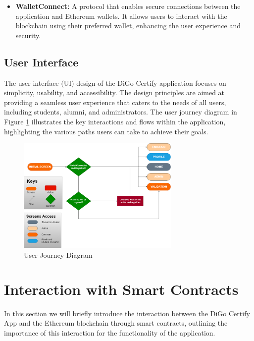 \begin{itemize}
    \item \textbf{WalletConnect:} A protocol that enables secure connections between the application and Ethereum wallets. It allows users to interact with the blockchain using their preferred wallet, enhancing the user experience and security.
\end{itemize}

\subsection{User Interface}

The user interface (UI) design of the DiGo Certify application focuses on simplicity, usability, and accessibility. The design principles are aimed at providing a seamless user experience that caters to the needs of all users, including students, alumni, and administrators.
The user journey diagram in Figure \ref{fig:user-journey} illustrates the key interactions and flows within the application, highlighting the various paths users can take to achieve their goals.

\begin{figure}[H]
    \centering
    \includegraphics[width=0.7\textwidth]{./assets/app-flow.drawio.png}
    \caption{User Journey Diagram}
    \label{fig:user-journey}
\end{figure}

\section{Interaction with Smart Contracts}\label{sec:interaction-with-smart-contracts}
\paragraph{}

In this section we will briefly introduce the interaction between the DiGo Certify App and the Ethereum blockchain through smart contracts, outlining the importance of this interaction for the functionality of the application.

